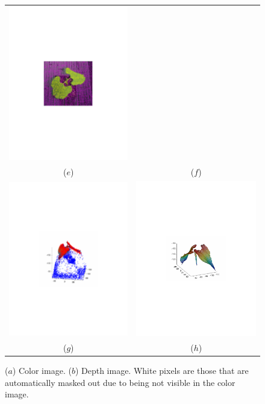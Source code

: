 \begin{figure}
\begin{center}
\begin{tabular}{cc}
\includegraphics[trim=190 280 190 290,clip,width=0.48\linewidth]{Figures/beanPointsOnLeaves} \\
($e$) & ($f$) \\
\includegraphics[trim=190 280 190 290,clip,width=0.48\linewidth]{Figures/bean3DMeshPlusPoints} &
\includegraphics[trim=190 280 190 290,clip,width=0.48\linewidth]{Figures/bean3DMesh} \\
($g$) & ($h$) \\
\end{tabular}
\end{center}
   \caption{($a$) Color image.  ($b$) Depth image.  White pixels are those that are automatically masked out due to being not visible in the color image.}
\label{fig:sigmainterframe}
\end{figure}



